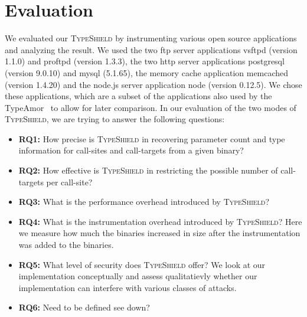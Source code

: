 \section{Evaluation}
\label{chapter:Evaluation}
We evaluated our \textsc{TypeShield} by instrumenting various open source applications and analyzing the result. 
We used the two ftp server applications vsftpd (version 1.1.0) and proftpd (version 1.3.3), the two http server 
applications postgresql (version 9.0.10) and  mysql (5.1.65), the memory cache application memcached (version 1.4.20) 
and the node.js server application node (version 0.12.5). We chose these applications, which are a subset of the 
applications also used by the TypeAmor~\cite{veen:typearmor} to allow for later comparison.
In our evaluation of the two modes of 
\textsc{TypeShield}, we are trying to answer the following questions:
\begin{itemize}

 \item \textbf{RQ1:} How precise is \textsc{TypeShield} in recovering parameter count and type information for call-sites and call-targets from a given binary?

 \item \textbf{RQ2:} How effective is \textsc{TypeShield} in restricting the possible number of call-targets per call-site?

 \item \textbf{RQ3:} What is the performance overhead introduced by \textsc{TypeShield}?
 
 \item \textbf{RQ4:} What is the instrumentation overhead introduced by \textsc{TypeShield}?
 Here we measure how much the binaries increased in size after the instrumentation was added to the binaries.
 
 \item \textbf{RQ5:} What level of security does \textsc{TypeShield} offer?
 We look at our implementation conceptually and assess qualitatievly whether our implementation can interfere with various classes of attacks. 
 
 \item \textbf{RQ6:} Need to be defined see down?
 
\end{itemize}

